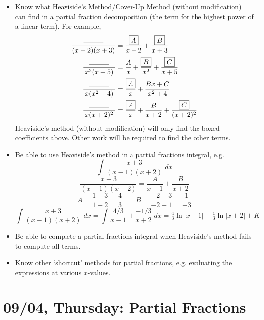 \documentclass[11pt,letterpaper]{article}
\begin{document}
\begin{itemize}
\item Know what Heaviside's Method/Cover-Up Method (without modification) can find in a partial fraction decomposition (the term for the highest power of a linear term). For example, 
	\[
	\begin{aligned}
	\dfrac{\;\;\;\rule{1cm}{0.3pt}\;\;\;}{(x - 2)(x + 3)}&= \dfrac{\boxed{A}}{x - 2} + \dfrac{\boxed{B}}{x + 3} \\
	\dfrac{\;\;\;\rule{1cm}{0.3pt}\;\;\;}{x^2(x + 5)}&= \dfrac{A}{x} + \dfrac{\boxed{B}}{x^2} + \dfrac{\boxed{C}}{x + 5} \\
	\dfrac{\;\;\;\rule{1cm}{0.3pt}\;\;\;}{x(x^2 + 4)}&= \dfrac{\boxed{A}}{x} + \dfrac{Bx + C}{x^2 + 4} \\
	\dfrac{\;\;\;\rule{1cm}{0.3pt}\;\;\;}{x(x + 2)^2}&= \dfrac{\boxed{A}}{x} + \dfrac{B}{x + 2} + \dfrac{\boxed{C}}{(x + 2)^2}
	\end{aligned}
	\]
Heaviside's method (without modification) will only find the boxed coefficients above. Other work will be required to find the other terms. 

\item Be able to use Heaviside's method in a partial fractions integral, e.g. 
	\[
	\int \dfrac{x + 3}{(x - 1)(x + 2)} \;dx
	\]
	\[
	\dfrac{x + 3}{(x - 1)(x + 2)}= \dfrac{A}{x - 1} + \dfrac{B}{x + 2}
	\]
	\[
	A= \dfrac{1 + 3}{1 + 2}= \dfrac{4}{3} \qquad B= \dfrac{-2 + 3}{-2 - 1}= \dfrac{1}{-3}
	\]
	\[
	\int \dfrac{x + 3}{(x - 1)(x + 2)} \;dx= \int \dfrac{4/3}{x - 1} + \dfrac{-1/3}{x + 2} \;dx= \tfrac{4}{3} \ln|x - 1| - \tfrac{1}{3} \ln|x + 2| + K
	\]

\item Be able to complete a partial fractions integral when Heaviside's method fails to compute all terms. 

\item Know other `shortcut' methods for partial fractions, e.g. evaluating the expressions at various $x$-values. 
\end{itemize}

\newpage
\section*{09/04, Thursday: Partial Fractions\label{09-04}}
\end{document}
